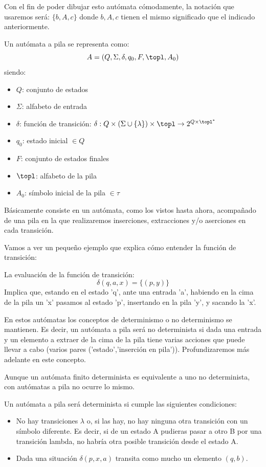 \documentclass{apuntes}
\begin{document}
Con el fin de poder dibujar esto autómata cómodamente, la notación que usaremos será:
$\{b,A,c\}$
donde $b,A,c$ tienen el mismo significado que el indicado anteriormente.



\begin{defn}
Un autómata a pila se representa como:
\[A=(Q, \Sigma, \delta, q_0, F, \topl, A_0)\]
siendo:
\begin{itemize}
\item $Q$: conjunto de estados
\item $\Sigma$: alfabeto de entrada
\item $\delta$: función de transición: $\delta:Q\times(\Sigma \cup \{\lambda\})\times \topl \rightarrow 2^{Q\times \topl^*}$
\item $q_0$: estado inicial $\in Q$
\item $F$: conjunto de estados finales
\item $\topl$: alfabeto de la pila
\item $A_0$: símbolo inicial de la pila $\in \tau$
\end{itemize}
Básicamente consiste en un autómata, como los vistos hasta ahora, acompañado de una pila en la que realizaremos inserciones, extracciones y/o aserciones en cada transición.
\end{defn}

Vamos a ver un pequeño ejemplo que explica cómo entender la función de transición:
\begin{example}
La evaluación de la función de transición:
\[\delta(q,a,x)=\{(p,y)\}\]
Implica que, estando en el estado 'q', ante una entrada 'a', habiendo en la cima de la pila un 'x' pasamos al estado 'p', insertando en la pila 'y', y sacando la 'x'.
\end{example}

En estos autómatas los conceptos de determinismo o no determinismo se mantienen. Es decir, un autómata a pila será no determinista si dada una entrada y un elemento a extraer de la cima de la pila tiene varias acciones que puede llevar a cabo (varios pares ('estado','inserción en pila')). Profundizaremos más adelante en este concepto.

\obs Aunque un autómata finito determinista es equivalente a uno no determinista, con autómatas a pila no ocurre lo mismo.

\begin{defn}
Un autómata a pila será determinista si cumple las siguientes condiciones:
\begin{itemize}
\item No hay transiciones $\lambda$ o, si las hay, no hay ninguna otra transición con un símbolo diferente. Es decir, si de un estado A pudieras pasar a otro B por una transición lambda, no habría otra posible transición desde el estado A.
\item Dada una situación $\delta (p,x,a)$ transita como mucho un elemento $(q,b)$.
\end{itemize}
\end{defn}
\end{document}
